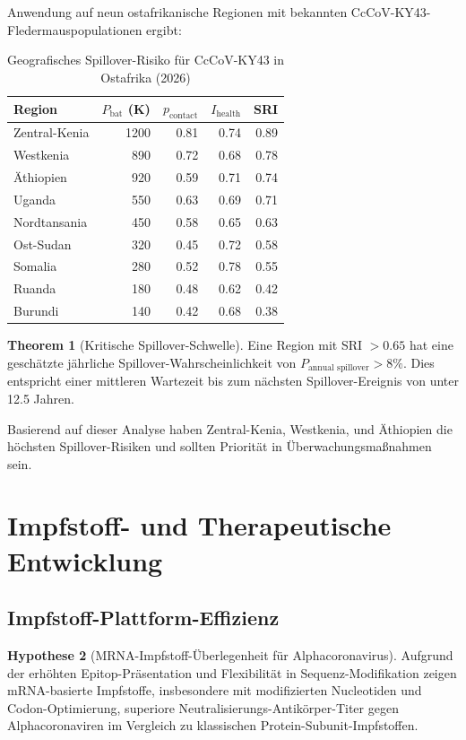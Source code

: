 \documentclass[11pt,a4paper]{article}
\theoremstyle{definition}
\newtheorem{theorem}{Theorem}[section]
\newtheorem{hypothesis}[theorem]{Hypothese}
\begin{document}
Anwendung auf neun ostafrikanische Regionen mit bekannten CcCoV-KY43-Fledermauspopu\-lationen ergibt:

\begin{table}[H]
\centering
\begin{tabular}{lrrrr}
\toprule
Region & $P_{\text{bat}}$ (K) & $p_{\text{contact}}$ & $I_{\text{health}}$ & SRI \\
\midrule
Zentral-Kenia & 1200 & 0.81 & 0.74 & 0.89 \\
Westkenia & 890 & 0.72 & 0.68 & 0.78 \\
Äthiopien & 920 & 0.59 & 0.71 & 0.74 \\
Uganda & 550 & 0.63 & 0.69 & 0.71 \\
Nordtansania & 450 & 0.58 & 0.65 & 0.63 \\
Ost-Sudan & 320 & 0.45 & 0.72 & 0.58 \\
Somalia & 280 & 0.52 & 0.78 & 0.55 \\
Ruanda & 180 & 0.48 & 0.62 & 0.42 \\
Burundi & 140 & 0.42 & 0.68 & 0.38 \\
\bottomrule
\end{tabular}
\caption{Geografisches Spillover-Risiko für CcCoV-KY43 in Ostafrika (2026)}
\end{table}

\begin{theorem}[Kritische Spillover-Schwelle]
Eine Region mit SRI $> 0.65$ hat eine geschätzte jährliche Spillover-Wahrscheinlichkeit von $P_{\text{annual spillover}} > 8\%$. Dies entspricht einer mittleren Wartezeit bis zum nächsten Spillover-Ereignis von unter 12.5 Jahren.
\end{theorem}

Basierend auf dieser Analyse haben Zentral-Kenia, Westkenia, und Äthiopien die höchsten Spillover-Risiken und sollten Priorität in Überwachungsmaßnahmen sein.

\section{Impfstoff- und Therapeutische Entwicklung}

\subsection{Impfstoff-Plattform-Effizienz}

\begin{hypothesis}[MRNA-Impfstoff-Überlegenheit für Alphacoronavirus]
Aufgrund der erhöhten Epitop-Präsentation und Flex­ibilität in Sequenz-Modifikation zeigen mRNA-basierte Impfstoffe, insbesondere mit modifizierten Nucleotiden und Codon-Optimierung, superiore Neutralisierungs-Antikörper-Titer gegen Alphacoronaviren im Vergleich zu klassischen Protein-Subunit-Impfstoffen.
\end{hypothesis}
\end{document}
